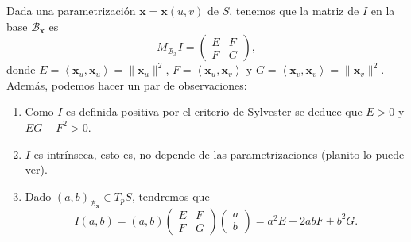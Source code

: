 \begin{observation} Dada una parametrización $\displaystyle \textbf{x} = \textbf{x} \left(u,v\right) $ de $\displaystyle S $, tenemos que la matriz de $\displaystyle I $ en la base $\displaystyle \mathcal{B}_{ \textbf{x} } $ es 
	\[M_{ \mathcal{B}_{x}}I = \begin{pmatrix} E & F \\ F & G \end{pmatrix} ,\]
	donde $\displaystyle E = \left\langle \textbf{x} _{u}, \textbf{x} _{u} \right\rangle =\| \textbf{x} _{u}\|^{2} $, $\displaystyle F = \left\langle \textbf{x} _{u}, \textbf{x} _{v} \right\rangle  $ y $\displaystyle G = \left\langle \textbf{x} _{v}, \textbf{x} _{v} \right\rangle =\| \textbf{x} _{v}\|^{2} $. Además, podemos hacer un par de observaciones:
	\begin{enumerate}
	\item Como $\displaystyle I $ es definida positiva por el criterio de Sylvester se deduce que $\displaystyle E > 0 $ y $\displaystyle EG-F^{2} > 0 $.
\item $\displaystyle I $ es intrínseca, esto es, no depende de las parametrizaciones (planito lo puede ver).
\item Dado $\displaystyle \left(a,b\right)_{\mathcal{B}_{ \textbf{x} }} \in T_{p}S$, tendremos que 
	\[I\left(a,b\right)=\left(a,b\right)\begin{pmatrix} E & F \\ F & G \end{pmatrix}\begin{pmatrix} a \\ b \end{pmatrix} = a^{2}E + 2ab F + b^{2}G.\]
	\end{enumerate}
\end{observation}

